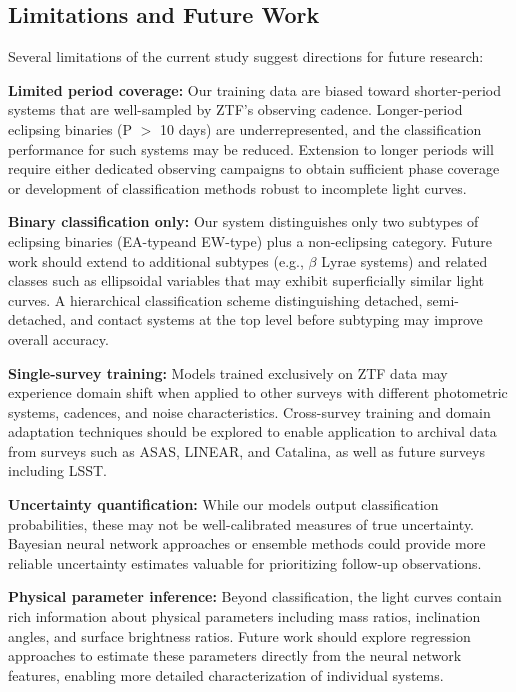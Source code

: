 \documentclass[11pt,a4paper]{article}
\newcommand{\EA}{EA-type}
\newcommand{\EW}{EW-type}
\begin{document}
\subsection{Limitations and Future Work}

Several limitations of the current study suggest directions for future research:

\textbf{Limited period coverage:} Our training data are biased toward shorter-period systems that are well-sampled by ZTF's observing cadence. Longer-period eclipsing binaries (P $>$ 10 days) are underrepresented, and the classification performance for such systems may be reduced. Extension to longer periods will require either dedicated observing campaigns to obtain sufficient phase coverage or development of classification methods robust to incomplete light curves.

\textbf{Binary classification only:} Our system distinguishes only two subtypes of eclipsing binaries (\EA and \EW) plus a non-eclipsing category. Future work should extend to additional subtypes (e.g., $\beta$ Lyrae systems) and related classes such as ellipsoidal variables that may exhibit superficially similar light curves. A hierarchical classification scheme distinguishing detached, semi-detached, and contact systems at the top level before subtyping may improve overall accuracy.

\textbf{Single-survey training:} Models trained exclusively on ZTF data may experience domain shift when applied to other surveys with different photometric systems, cadences, and noise characteristics. Cross-survey training and domain adaptation techniques should be explored to enable application to archival data from surveys such as ASAS, LINEAR, and Catalina, as well as future surveys including LSST.

\textbf{Uncertainty quantification:} While our models output classification probabilities, these may not be well-calibrated measures of true uncertainty. Bayesian neural network approaches or ensemble methods could provide more reliable uncertainty estimates valuable for prioritizing follow-up observations.

\textbf{Physical parameter inference:} Beyond classification, the light curves contain rich information about physical parameters including mass ratios, inclination angles, and surface brightness ratios. Future work should explore regression approaches to estimate these parameters directly from the neural network features, enabling more detailed characterization of individual systems.
\end{document}

